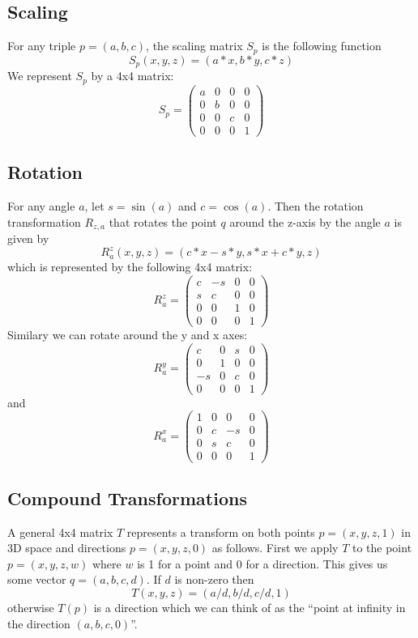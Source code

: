 \documentclass{book}
\begin{document}
\subsection{Scaling}
For any triple $p=(a,b,c)$, the scaling matrix $S_p$ is the following function
\[
S_p(x,y,z) = (a*x, b*y, c*z)
\]
We represent $S_p$ by a 4x4 matrix:
\[
S_p =
\left (
\begin{array}{cccc}
a & 0 & 0 & 0 \\
0 & b & 0 & 0 \\
0 & 0 & c & 0 \\
0 & 0 & 0 & 1
\end{array}
\right )
\]

\subsection{Rotation}
For any angle $a$, let $s = \sin(a)$ and $c=\cos(a)$. Then the
rotation transformation $R_{z,a}$ that rotates the point $q$ around the z-axis by the angle $a$ is given by
\[
R^z_a(x,y,z) = (c*x - s*y, s*x + c*y, z)
\]
which is represented by the following 4x4 matrix:
\[
R^z_a =
\left (
\begin{array}{cccc}
c & -s & 0 & 0 \\
s & c & 0 & 0 \\
0 & 0 & 1 & 0 \\
0 & 0 & 0 & 1
\end{array}
\right )
\]
Similary we can rotate around the y and x axes:
\[
R^y_a =
\left (
\begin{array}{cccc}
 c & 0 & s & 0 \\
 0 & 1 & 0 & 0 \\
-s & 0 & c & 0 \\
 0 & 0 & 0 & 1
\end{array}
\right )
\]
and
\[
R^x_a =
\left (
\begin{array}{cccc}
1 & 0 & 0 & 0 \\
0 & c & -s & 0 \\
0 & s & c & 0 \\
0 & 0 & 0 & 1
\end{array}
\right )
\]

\subsection{Compound Transformations}
A general 4x4 matrix $T$ represents a transform on both points $p=(x,y,z,1)$ in 3D space and
directions $p=(x,y,z,0)$ as follows.
First we apply $T$ to the point $p=(x,y,z,w)$ where $w$ is 1 for a point and 0 for a direction.
This gives us some vector $q=(a,b,c,d)$. If $d$ is non-zero then
\[
T(x,y,z) = (a/d, b/d, c/d, 1)
\]
otherwise $T(p)$ is a direction which we can think of as the ``point at infinity in the direction $(a,b,c,0)$''.
\end{document}
